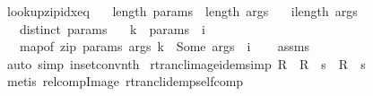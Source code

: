 \begin{isabellebody}
\endisatagproof
{\isafoldproof}%
%
\isadelimproof
\isanewline
%
\endisadelimproof
\isanewline
\isanewline
{}\isamarkupfalse%
\ lookup{\isacharunderscore}{\kern0pt}zip{\isacharunderscore}{\kern0pt}idx{\isacharunderscore}{\kern0pt}eq{\isacharcolon}{\kern0pt}\isanewline
\ \ \ {\isachardoublequoteopen}length\ params\ {\isacharequal}{\kern0pt}\ length\ args{\isachardoublequoteclose}\isanewline
\ \ \ {\isachardoublequoteopen}i{\isacharless}{\kern0pt}length\ args{\isachardoublequoteclose}\isanewline
\ \ \ {\isachardoublequoteopen}distinct\ params{\isachardoublequoteclose}\isanewline
\ \ \ {\isachardoublequoteopen}k\ {\isacharequal}{\kern0pt}\ params\ {\isacharbang}{\kern0pt}\ i{\isachardoublequoteclose}\isanewline
\ \ \ {\isachardoublequoteopen}map{\isacharunderscore}{\kern0pt}of\ {\isacharparenleft}{\kern0pt}zip\ params\ args{\isacharparenright}{\kern0pt}\ k\ {\isacharequal}{\kern0pt}\ Some\ {\isacharparenleft}{\kern0pt}args\ {\isacharbang}{\kern0pt}\ i{\isacharparenright}{\kern0pt}{\isachardoublequoteclose}\isanewline
%
\isadelimproof
\ \ %
\endisadelimproof
%
\isatagproof
{}\isamarkupfalse%
\ assms\isanewline
\ \ \isamarkupfalse%
\ {\isacharparenleft}{\kern0pt}auto\ simp{\isacharcolon}{\kern0pt}\ in{\isacharunderscore}{\kern0pt}set{\isacharunderscore}{\kern0pt}conv{\isacharunderscore}{\kern0pt}nth{\isacharparenright}{\kern0pt}%
\endisatagproof
{\isafoldproof}%
%
\isadelimproof
\isanewline
%
\endisadelimproof
\isanewline
{}\isamarkupfalse%
\ rtrancl{\isacharunderscore}{\kern0pt}image{\isacharunderscore}{\kern0pt}idem{\isacharbrackleft}{\kern0pt}simp{\isacharbrackright}{\kern0pt}{\isacharcolon}{\kern0pt}\ {\isachardoublequoteopen}R\isactrlsup {\isacharasterisk}{\kern0pt}\ {\isacharbackquote}{\kern0pt}{\isacharbackquote}{\kern0pt}\ R\isactrlsup {\isacharasterisk}{\kern0pt}\ {\isacharbackquote}{\kern0pt}{\isacharbackquote}{\kern0pt}\ s\ {\isacharequal}{\kern0pt}\ R\isactrlsup {\isacharasterisk}{\kern0pt}\ {\isacharbackquote}{\kern0pt}{\isacharbackquote}{\kern0pt}\ s{\isachardoublequoteclose}\isanewline
%
\isadelimproof
\ \ %
\endisadelimproof
%
\isatagproof
{}\isamarkupfalse%
\ {\isacharparenleft}{\kern0pt}metis\ relcomp{\isacharunderscore}{\kern0pt}Image\ rtrancl{\isacharunderscore}{\kern0pt}idemp{\isacharunderscore}{\kern0pt}self{\isacharunderscore}{\kern0pt}comp{\isacharparenright}{\kern0pt}%
\endisatagproof
{\isafoldproof}%
%
\isadelimproof
%
\endisadelimproof

\end{isabellebody}
